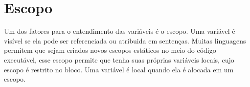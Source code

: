 \documentclass[12pt, onecolumn]{article}
\begin{document}
		\section{Escopo}
	
	Um dos fatores para o entendimento das variáveis é o escopo. Uma variável
	é visível se ela pode ser referenciada ou atribuida em sentenças.
	Muitas linguagens permitem que sejam criados novos escopos estáticos no
	meio do código executável, esse escopo permite que tenha suas próprias
	variáveis locais, cujo escopo é restrito no bloco. Uma variável é local
	quando ela é alocada em um escopo.\\
	\\
	
\end{document}
